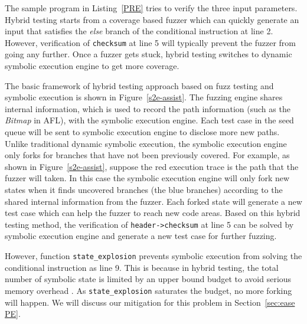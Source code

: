 The sample program in Listing~\ref{PRE} tries to verify the three input
parameters. Hybrid testing starts from a coverage based fuzzer which
can quickly generate an input that satisfies the \textit{else} branch
of the conditional instruction at line 2. However, verification of
\texttt{checksum} at line 5 will typically prevent the fuzzer from
going any further. Once a fuzzer gets stuck, hybrid testing switches to
dynamic symbolic execution engine to get more coverage.

The basic framework of hybrid testing approach based on fuzz testing
and symbolic execution is shown in Figure~\ref{s2e-assist}. The fuzzing
engine shares internal information, which is used to record the path
information (such as the \textit{Bitmap} in AFL), with the symbolic
execution engine. Each test case in the seed queue will be sent to
symbolic execution engine to disclose more new paths. Unlike
traditional dynamic symbolic execution, the symbolic execution engine
only forks for branches that have not been previously covered. For
example, as shown in Figure~\ref{s2e-assist}, suppose the red execution
trace is the path that the fuzzer will taken. In this case the symbolic
execution engine will only fork new states when it finds uncovered
branches (the blue branches) according to the shared internal
information from the fuzzer. Each forked state will generate a new test
case which can help the fuzzer to reach new code areas. Based on this
hybrid testing method, the verification of \texttt{header->checksum} at
line 5 can be solved by symbolic execution engine and generate a new
test case for further fuzzing.

However, function \texttt{state\_explosion} prevents symbolic execution
from solving the conditional instruction as line 9. This is because in
hybrid testing, the total number of symbolic state is limited by an
upper bound budget to avoid serious memory overhead
\cite{stephens2016driller}. As \texttt{state\_explosion} saturates the
budget, no more forking will happen.  We will discuss our mitigation
for this problem in Section~\ref{sec:ease PE}.
